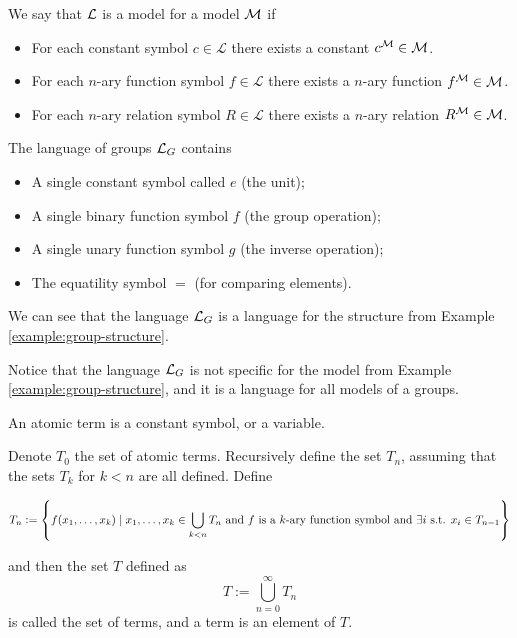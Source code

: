 \documentclass[11pt,a4paper]{article}
\begin{document}
\begin{definition}
  We say that $\mathcal{L}$ is a model for a model $\mathcal{M}$ if
  \begin{itemize}
    \item For each constant symbol $c \in \mathcal L$ there exists a constant
      $c^{\mathcal{M}} \in \mathcal{M}$.
    \item For each $n$-ary function symbol $f \in \mathcal L$ there exists 
      a $n$-ary function $f^{\mathcal{M}} \in \mathcal{M}$.
    \item For each $n$-ary relation symbol $R \in \mathcal L$ there exists 
      a $n$-ary relation $R^{\mathcal{M}} \in \mathcal{M}$.
  \end{itemize}
\end{definition}

\begin{example}
  The language of groups $\mathcal{L}_G$ contains
  \begin{itemize}
    \item A single constant symbol called $e$ (the unit);
    \item A single binary function symbol $f$ (the group operation);
    \item A single unary function symbol $g$ (the inverse operation);
    \item The equatility symbol $=$ (for comparing elements).
  \end{itemize}
  We can see that the language $\mathcal{L}_G$ is a language for the structure
  from Example \ref{example:group-structure}.
\end{example}
\begin{remark}
  Notice that the language $\mathcal{L}_G$ is not specific for the model from
  Example \ref{example:group-structure}, and it is a language for
  all models of a groups.
\end{remark}

\begin{definition}
  An atomic term is a constant symbol, or a variable.
\end{definition}

\begin{definition}[Term]
  Denote $T_0$ the set of atomic terms.
  Recursively define the set $T_n$, assuming that the sets $T_k$ for $k < n$
  are all defined. Define
  \begin{small}
  \[
    T_n := \left\{f(x_1,\dots,x_k) \mid
    x_1,\dots,x_k \in \bigcup_{k < n} T_n \text{ and $f$ is a $k$-ary 
    function symbol and } \exists i \text{ s.t. } x_i \in T_{n-1}\right\}
  \]
  \end{small}
  and then the set $T$ defined as
  \[
    T := \bigcup_{n=0}^{\infty} T_n
  \]
  is called the set of terms, and a term is an element of $T$.
\end{definition}
\end{document}
